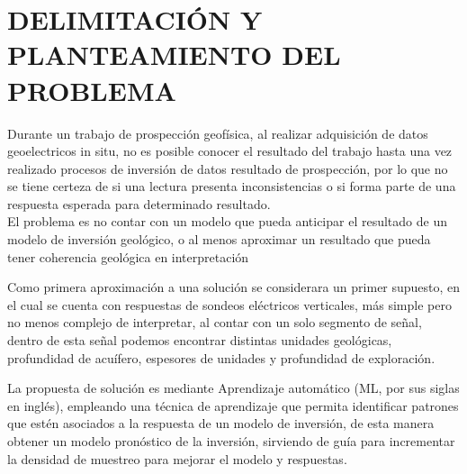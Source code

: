\chapter{DELIMITACIÓN Y PLANTEAMIENTO DEL PROBLEMA}

Durante un trabajo de prospección geofísica, al realizar adquisición de datos geoelectricos in situ, no es posible conocer el resultado del trabajo hasta una vez realizado procesos de inversión de datos resultado de prospección, por lo que no se tiene certeza de si una lectura presenta inconsistencias o si forma parte de una respuesta esperada para determinado resultado.\\

El problema es no contar con un modelo que pueda anticipar el resultado de un modelo de inversión geológico, o al menos aproximar un resultado que pueda tener coherencia geológica en interpretación

Como primera aproximación a una solución se considerara un primer supuesto, en el cual se cuenta con respuestas de sondeos eléctricos verticales, más simple pero no menos complejo de interpretar, al contar con un solo segmento de señal, dentro de esta señal podemos encontrar distintas unidades geológicas, profundidad de acuífero, espesores de unidades y profundidad de exploración.

La propuesta de solución es mediante Aprendizaje automático (ML, por sus siglas en inglés), empleando una técnica de aprendizaje que permita identificar patrones que estén asociados a la respuesta de un modelo de inversión, de esta manera obtener un modelo pronóstico de la inversión, sirviendo de guía para incrementar la densidad de muestreo para mejorar el modelo y respuestas.  

